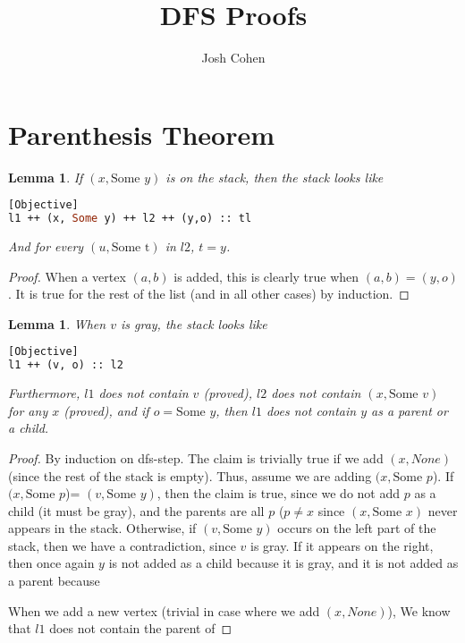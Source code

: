 \documentclass{article}
\title{DFS Proofs}
\author{Josh Cohen}
\newtheorem{lemma}[theorem]{Lemma}
\begin{document}
\maketitle
\section{Parenthesis Theorem}
\begin{lemma}
If $(x, \text{Some } y)$ is on the stack, then the stack looks like
\begin{lstlisting}[language=Caml][Objective]
l1 ++ (x, Some y) ++ l2 ++ (y,o) :: tl
\end{lstlisting}
And for every $(u, \text{Some t})$ in $l2$, $t=y$.
\end{lemma}
\begin{proof}
When a vertex $(a,b)$ is added, this is clearly true when $(a,b)=(y,o)$. It is true for the rest of the list (and in all other cases) by induction.
\end{proof}
\begin{lemma}
When $v$ is gray, the stack looks like
\begin{lstlisting}[language=Caml][Objective]
l1 ++ (v, o) :: l2
\end{lstlisting}
Furthermore, $l1$ does not contain $v$ (proved), $l2$ does not contain $(x, \text{Some }v)$ for any $x$ (proved), and if $o=\text{Some }y$, then $l1$ does not contain $y$ as a parent or a child. 
\end{lemma}
\begin{proof}
By induction on dfs-step. The claim is trivially true if we add $(x, None)$ (since the rest of the stack is empty). Thus, assume we are adding $(x, \text{Some }p$). If $(x, \text{Some }p$)= $(v, \text{Some }y)$, then the claim is true, since we do not add $p$ as a child (it must be gray), and the parents are all $p$ ($p\neq x$ since $(x, \text{Some } x)$ never appears in the stack. Otherwise, if $(v, \text{Some }y)$ occurs on the left part of the stack, then we have a contradiction, since $v$ is gray. If it appears on the right, then once again $y$ is not added as a child because it is gray, and it is not added as a parent because 

 When we add a new vertex (trivial in case where we add $(x, None)$), We know that $l1$ does not contain the parent of 
\end{proof}
\end{document}
